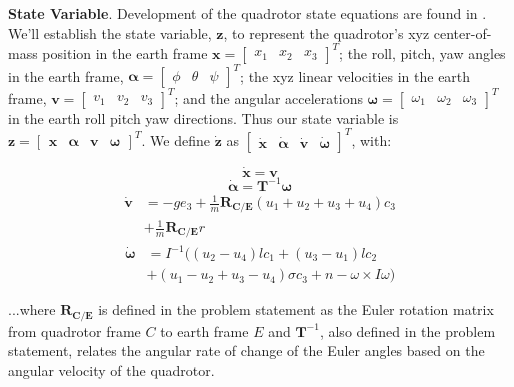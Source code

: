 \documentclass{article}
\begin{document}
\begin{multicols}{2}
\noindent \textbf{State Variable}.  Development of the quadrotor state equations are found in \cite{FaalD}.  We'll establish the state variable, $\mathbf{z}$, to represent the quadrotor's xyz center-of-mass position in the earth frame $\mathbf{x}=\begin{bmatrix}x_1 & x_2 & x_3\end{bmatrix}^T$; the roll, pitch, yaw angles in the earth frame, $\bm{\alpha} =\begin{bmatrix}\phi & \theta & \psi\end{bmatrix}^T$; the xyz linear velocities in the earth frame, $\mathbf{v}=\begin{bmatrix}v_1 & v_2 & v_3\end{bmatrix}^T$; and the angular accelerations $\bm{\omega}=\begin{bmatrix}\omega_1 & \omega_2 & \omega_3\end{bmatrix}^T$ in the earth roll pitch yaw directions. Thus our state variable is $\mathbf{z}=\begin{bmatrix}\mathbf{x} &\bm{\alpha}&\mathbf{v}&\bm{\omega}\end{bmatrix}^T$. We define $\boldsymbol{\dot{z}}$ as $\begin{bmatrix} \mathbf{\dot{x}} &\bm{\dot{\alpha}}&\mathbf{\dot{v}}&\bm{\dot{\omega}} \end{bmatrix}^T$, with:

\begin{equation}
    \mathbf{\dot{x}} =\mathbf{v}
\end{equation}
\begin{equation}
    \bm{\dot{\alpha}} =\mathbf{T}^{-1}\bm{\omega}
\end{equation}
\begin{align}
    \mathbf{\dot{v}} &=-ge_3+\frac{1}{m}\mathbf{R_{C/E}}(u_1+u_2+u_3+u_4)c_3 \nonumber\\ &+\frac{1}{m}\mathbf{R_{C/E}}r
\end{align}
\begin{align}
    \bm{\dot{\omega}} &=I^{-1}((u_2-u_4)lc_1+(u_3-u_1)lc_2 \nonumber\\ &+(u_1-u_2+u_3-u_4)\sigma c_3+n-\omega \times I \omega)
\end{align}

\noindent ...where $\mathbf{R_{C/E}}$ is defined in the problem statement as the Euler rotation matrix from quadrotor frame $C$ to earth frame $E$ and $\mathbf{T}^{-1}$, also defined in the problem statement, relates the angular rate of change of the Euler angles based on the angular velocity of the quadrotor.


\end{multicols}
\end{document}
